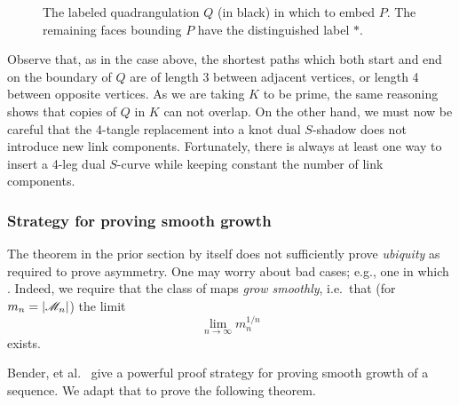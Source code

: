 \documentclass[amsmath,longbibliography,secnumarabic,floatfix,amssymb,nofootinbib,nobibnotes,letterpaper,11pt,tightenlines,notitlepage,showkeys,showlabels]{amsart}%
\begin{document}
\begin{enumerate}
\begin{enumerate}[i.]
\begin{figure}[h!]
      \caption{The labeled quadrangulation $Q$ (in black) in which to
        embed $P$. The remaining
        faces bounding $P$ have the distinguished label $*$.}
      \label{fig:knottangrep}
    \end{figure}
    Observe that, as in the case above, the shortest paths which both
    start and end on the boundary of $Q$ are of length 3 between
    adjacent vertices, or length 4 between opposite vertices. As we
    are taking $K$ to be prime, the same reasoning shows that copies
    of $Q$ in $K$ can not overlap. On the other hand, we must now be
    careful that the 4-tangle replacement into a knot dual $S$-shadow
    does not introduce new link components. Fortunately, there is
    always at least one way to insert a 4-leg dual $S$-curve while
    keeping constant the number of link components.
  \end{enumerate}
\end{enumerate}

\subsubsection{Strategy for proving smooth growth}
\label{sec:smoothstratproof}

The theorem in the prior section by itself does not sufficiently prove \emph{ubiquity} as required
to prove asymmetry. One may worry about bad cases; e.g., one in which . Indeed, we require that the
class of maps \emph{grow smoothly}, i.e.\ that (for $m_n = |\mathscr{M}_n|$) the limit
\[ \lim_{n\to\infty}{m_n^{1/n}} \] exists.

Bender, et al.\ \cite{Bender1992104} give a powerful proof strategy for proving smooth growth of a
sequence. We adapt that to prove the following theorem.
\end{document}

